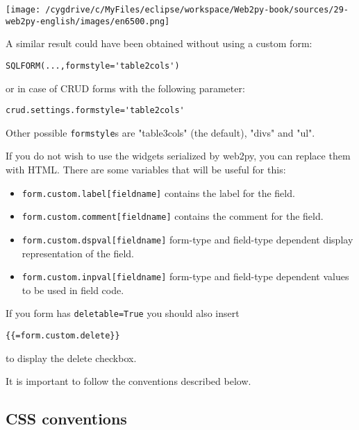\documentclass[justified,sixbynine,notoc]{tufte-book}
\def\ft{\small\tt}
\begin{document}
\begin{fullwidth}
\goodbreak\begin{center}\texttt{[image: /cygdrive/c/MyFiles/eclipse/workspace/Web2py-book/sources/29-web2py-english/images/en6500.png]}\end{center}


A similar result could have been obtained without using a custom form:

\begin{lstlisting}
SQLFORM(...,formstyle='table2cols')
\end{lstlisting}
\noindent or in case of CRUD forms with the following parameter:

\begin{lstlisting}
crud.settings.formstyle='table2cols'
\end{lstlisting}

Other possible {\ft formstyle}s are "table3cols" (the default), "divs" and "ul".

If you do not wish to use the widgets serialized by web2py, you can replace them with HTML. There are some variables that will be useful for this:
\begin{itemize}
\item {\ft form.custom.label[fieldname]} contains the label for the field.

\item {\ft form.custom.comment[fieldname]} contains the comment for the field.

\item {\ft form.custom.dspval[fieldname]} form-type and field-type dependent display representation of the field.

\item {\ft form.custom.inpval[fieldname]} form-type and field-type dependent values to be used in field code.
\end{itemize}

If you form has {\ft deletable=True} you should also insert

\begin{lstlisting}[keywords={}]
{{=form.custom.delete}}
\end{lstlisting}
\noindent to display the delete checkbox.

It is important to follow the conventions described below.

\goodbreak\subsection{CSS conventions}


\end{fullwidth}
\end{document}
